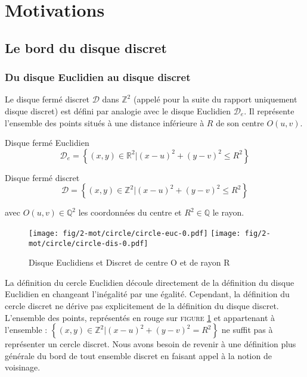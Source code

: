 \section{Motivations}

\subsection{Le bord du disque discret}

\subsubsection{Du disque Euclidien au disque discret}


Le  disque fermé discret $\mathcal{D}$ dans $\mathbb{Z}^{2}$ (appelé pour la suite du rapport uniquement disque discret) est défini par analogie avec le disque Euclidien $\mathcal{D}_e$. Il représente l'ensemble des points situés à une distance inférieure à $R$ de son centre $O(u,v)$.


\begin{Definition}{Disque fermé Euclidien}
\label{def:disk-euc}
 $$\mathcal{D}_e =  \left\{ (x,y) \in \mathbb{R}^{2} |  (x - u)^2 + (y - v)^2 \leq R^2 \right\}$$
\end{Definition}

\begin{Definition}{Disque fermé discret}
\label{def:disk-dis}
  $$\mathcal{D} =  \left\{ (x,y) \in \mathbb{Z}^{2} |  (x - u)^2 + (y - v)^2 \leq R^2 \right\}$$
  
  avec $O(u,v) \in \mathbb{Q}^{2}$ les coordonnées du centre et $R^2 \in \mathbb{Q}$ le rayon.\\
\end{Definition}

\begin{figure}[H]
  \centering
  \texttt{[image: fig/2-mot/circle/circle-euc-0.pdf]}
  \texttt{[image: fig/2-mot/circle/circle-dis-0.pdf]}
  \caption{Disque Euclidiens et Discret de centre O et de rayon R}
\label{fig:disk}
\end{figure}

La définition du cercle Euclidien découle directement de la définition du disque Euclidien en changeant l'inégalité par une égalité. Cependant, la définition du cercle discret ne dérive pas explicitement de la définition du disque discret. L'ensemble des points, représentés en rouge sur \textsc{figure} \ref{fig:disk} et appartenant à l'ensemble : $\left\{ (x,y) \in \mathbb{Z}^{2} |  (x - u)^2 + (y - v)^2 = R^2 \right\}$ ne suffit pas à représenter un cercle discret. Nous avons besoin de revenir à une définition plus générale du bord de tout ensemble discret en faisant appel à la notion de voisinage.\\

